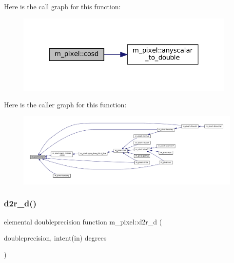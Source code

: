 Here is the call graph for this function\+:
\nopagebreak
\begin{figure}[H]
\begin{center}
\leavevmode
\includegraphics[width=309pt]{namespacem__pixel_a312c40bfbd03b2bbe6f85bc5efca6ce3_cgraph}
\end{center}
\end{figure}
Here is the caller graph for this function\+:
\nopagebreak
\begin{figure}[H]
\begin{center}
\leavevmode
\includegraphics[width=350pt]{namespacem__pixel_a312c40bfbd03b2bbe6f85bc5efca6ce3_icgraph}
\end{center}
\end{figure}
\mbox{\label{namespacem__pixel_a2ea42e55432274dec04fdc822e484cdb}} 
\subsubsection{\texorpdfstring{d2r\+\_\+d()}{d2r\_d()}}
{\footnotesize\ttfamily elemental doubleprecision function m\+\_\+pixel\+::d2r\+\_\+d (\begin{DoxyParamCaption}\item[{doubleprecision, intent(in)}]{degrees }\end{DoxyParamCaption})\hspace{0.3cm}{\ttfamily [private]}}

\mbox{\label{namespacem__pixel_a0ac7088105ca5334d0ca3f1e4ea16d65}} 
